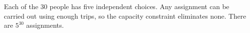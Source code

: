 Each of the $30$ people has five independent choices. Any assignment can be carried out using enough trips, so the capacity constraint eliminates none. There are $\boxed{5^{30}}$ assignments.
